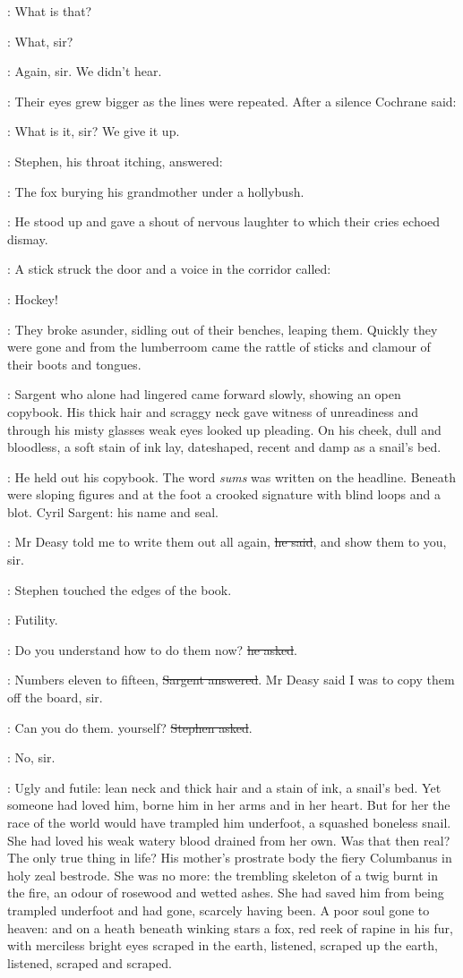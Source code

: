\Stephen:
What is that?

\comyn:
What, sir?

\armstrong:
Again, sir.
We didn't hear.

:
Their eyes grew bigger as the lines were repeated.
After a silence Cochrane said:

\cochrane:
What is it, sir?
We give it up.

:
Stephen, his throat itching, answered:

\Stephen:
The fox burying his grandmother under a hollybush.

:
He stood up and gave a shout of nervous laughter
to which their cries echoed dismay.

:
A stick struck the door and a voice in the corridor called:

\deasy:
Hockey!

:
They broke asunder, sidling out of their benches, leaping them.
Quickly they were gone
and from the lumberroom came the rattle of sticks
and clamour of their boots and tongues.

:
Sargent who alone had lingered
came forward slowly, showing an open copybook.
His thick hair and scraggy neck gave witness of unreadiness
and through his misty glasses weak eyes looked up pleading.
On his cheek, dull and bloodless,
a soft stain of ink lay, dateshaped,
recent and damp as a snail's bed.

:
He held out his copybook.
The word \emph{sums} was written on the headline.
Beneath were sloping figures
and at the foot a crooked signature with blind loops and a blot.
Cyril Sargent: his name and seal.

\sargent:
Mr Deasy told me to write them out all again, \sout{he said},
and show them to you, sir.

:
Stephen touched the edges of the book.

\StephenInt:
Futility.

\Stephen:
Do you understand how to do them now?
\sout{he asked}.

\sargent:
Numbers eleven to fifteen,
\sout{Sargent answered}.
Mr Deasy said I was to copy them off the board, sir.

\Stephen:
Can you do them. yourself?
\sout{Stephen asked}.

\sargent:
No, sir.

\StephenInt:
Ugly and futile:
lean neck and thick hair
and a stain of ink, a snail's bed.
Yet someone had loved him, borne him in her arms and in her heart.
But for her the race of the world would have trampled him underfoot,
a squashed boneless snail.
She had loved his weak watery blood drained from her own.
Was that then real?
The only true thing in life?
His mother's prostrate body
the fiery Columbanus in holy zeal bestrode.
She was no more:
the trembling skeleton of a twig burnt in the fire,
an odour of rosewood and wetted ashes.
She had saved him from being trampled underfoot
and had gone, scarcely having been.
A poor soul gone to heaven:
and on a heath beneath winking stars
a fox, red reek of rapine in his fur,
with merciless bright eyes scraped in the earth,
listened, scraped up the earth,
listened, scraped and scraped.

